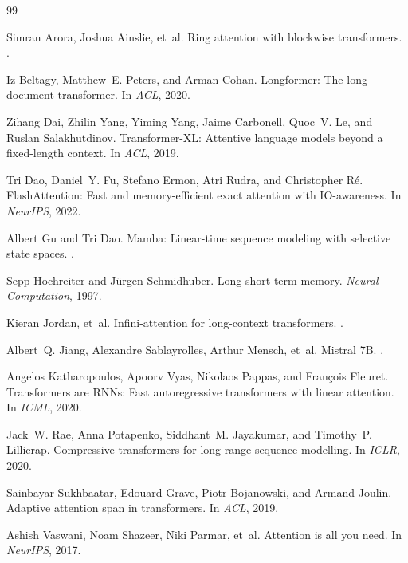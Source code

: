 \documentclass{article}
\begin{document}

\begin{thebibliography}{99}

Simran Arora, Joshua Ainslie, et~al.
\newblock Ring attention with blockwise transformers.
.

Iz Beltagy, Matthew~E. Peters, and Arman Cohan.
\newblock Longformer: The long-document transformer.
\newblock In \emph{ACL}, 2020.

Zihang Dai, Zhilin Yang, Yiming Yang, Jaime Carbonell, Quoc~V. Le, and Ruslan Salakhutdinov.
\newblock Transformer-{XL}: Attentive language models beyond a fixed-length context.
\newblock In \emph{ACL}, 2019.

Tri Dao, Daniel~Y. Fu, Stefano Ermon, Atri Rudra, and Christopher R\'e.
\newblock FlashAttention: Fast and memory-efficient exact attention with {IO}-awareness.
\newblock In \emph{NeurIPS}, 2022.

Albert Gu and Tri Dao.
\newblock Mamba: Linear-time sequence modeling with selective state spaces.
.

Sepp Hochreiter and J\"urgen Schmidhuber.
\newblock Long short-term memory.
\newblock \emph{Neural Computation}, 1997.

Kieran Jordan, et~al.
\newblock Infini-attention for long-context transformers.
.

Albert~Q. Jiang, Alexandre Sablayrolles, Arthur Mensch, et~al.
\newblock Mistral 7{B}.
.

Angelos Katharopoulos, Apoorv Vyas, Nikolaos Pappas, and Fran\c{c}ois Fleuret.
\newblock Transformers are {RNN}s: Fast autoregressive transformers with linear attention.
\newblock In \emph{ICML}, 2020.

Jack~W. Rae, Anna Potapenko, Siddhant~M. Jayakumar, and Timothy~P. Lillicrap.
\newblock Compressive transformers for long-range sequence modelling.
\newblock In \emph{ICLR}, 2020.

Sainbayar Sukhbaatar, Edouard Grave, Piotr Bojanowski, and Armand Joulin.
\newblock Adaptive attention span in transformers.
\newblock In \emph{ACL}, 2019.

Ashish Vaswani, Noam Shazeer, Niki Parmar, et~al.
\newblock Attention is all you need.
\newblock In \emph{NeurIPS}, 2017.

\end{thebibliography}
\end{document}

